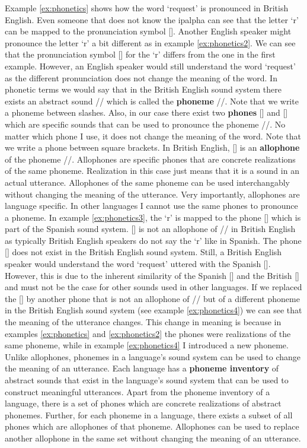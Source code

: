 Example \ref{ex:phonetics} shows how the word `request' is pronounced in British English. Even someone that does not know the \ac{ipalpha} can see that the letter `r' can be mapped to the pronunciation symbol []. Another English speaker might pronounce the letter `r' a bit different as in example \ref{ex:phonetics2}. We can see that the pronunciation symbol [] for the `r' differs from the one in the first example. 
However, an English speaker would still understand the word `request' as the different pronunciation does not change the meaning of the word. In phonetic terms we would say that in the British English sound system there exists an abstract sound // which is called the \textbf{phoneme} //. Note that we write a phoneme between slashes. 
Also, in our case there exist two \textbf{phones} [] and [] which are specific sounds that can be used to pronounce the phoneme //. No matter which phone I use, it does not change the meaning of the word. Note that we write a phone between square brackets. In British English, [] is an \textbf{allophone} of the phoneme //. 
Allophones are specific phones that are concrete realizations of the same phoneme. Realization in this case just means that it is a sound in an actual utterance. Allophones of the same phoneme can be used interchangably without changing the meaning of the utterance. Very importantly, allophones are language specific. In other languages I cannot use the same phones to pronounce a phoneme. In example \ref{ex:phonetics3}, the `r' is mapped to the phone [] which is part of the Spanish sound system. [] is not an allophone of // in British English as typically British English speakers do not say the `r' like in Spanish. The phone [] does not exist in the British English sound system. Still, a British English speaker would understand the word `request' uttered with the Spanish []. However, this is due to the inherent similarity of the Spanish [] and the British [] and must not be the case for other sounds used in other languages. If we replaced the [] by another phone that is not an allophone of // but of a different phoneme in the British English sound system (see example \ref{ex:phonetics4}) we can see that the meaning of the utterance changes. This change in meaning is because in examples \ref{ex:phonetics} and \ref{ex:phonetics2} the phones were realizations of the same phoneme, while in example \ref{ex:phonetics4} I introduced a new phoneme. Unlike allophones, phonemes in a language's sound system can be used to change the meaning of an utterance. Each language has a \textbf{phoneme inventory} of abstract sounds that exist in the language's sound system that can be used to construct meaningful utterances. Apart from the phoneme inventory of a language, there is a set of phones which are concrete realizations of abstract phonemes. Further, for each phoneme in a language, there exists a subset of all phones which are allophones of that phoneme. Allophones can be used to replace another allophone in the same set without changing the meaning of an utterance. 

